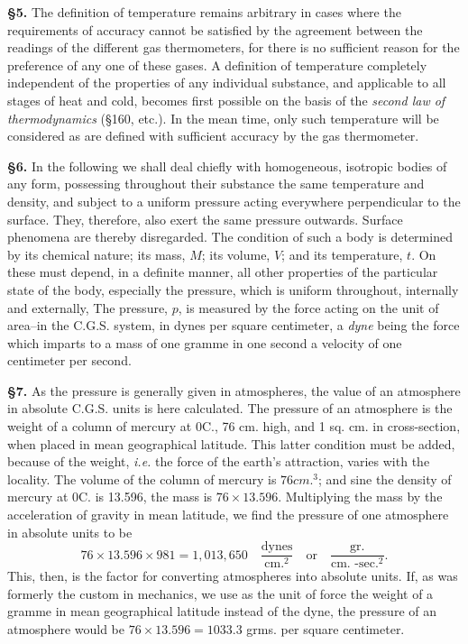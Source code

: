 \documentclass[oneside,12pt]{book}
\begin{document}
\textbf{\S 5.} The definition of temperature remains arbitrary in cases where the requirements of accuracy cannot be satisfied by the agreement between the readings of the different gas thermometers, for there is no sufficient reason for the preference of any one of these gases. A definition of temperature completely independent of the properties of any individual substance, and applicable to all stages of heat and cold, becomes first possible on the basis of the \textit{second law of thermodynamics} (\S 160, etc.). In the mean time, only such temperature will be considered as are defined with sufficient accuracy by the gas thermometer. \par

\textbf{\S 6.} In the following we shall deal chiefly with homogeneous, isotropic bodies of any form, possessing throughout their substance the same temperature and density, and subject to a uniform pressure acting everywhere perpendicular to the surface. They, therefore, also exert the same pressure outwards. Surface phenomena are thereby disregarded. The condition of such a body is determined by its chemical nature; its mass, $M$; its volume, $V$; and its temperature, $t$. On these must depend, in a definite manner, all other properties of the particular state of the body, especially the pressure, which is uniform throughout, internally and externally, The pressure, $p$, is measured by the force acting on the unit of area--in the C.G.S. system, in dynes per square centimeter, a \textit{dyne} being the force which imparts to a mass of one gramme in one second a velocity of one centimeter per second. \par

\textbf{\S 7.} As the pressure is generally given in atmospheres, the value of an atmosphere in absolute C.G.S. units is here calculated. The pressure of an atmosphere is the weight of a column of mercury at 0\textdegree C., 76 cm. high, and 1 sq. cm. in cross-section, when placed in mean geographical latitude. This latter condition must be added, because of the weight, \textit{i.e.} the force of the earth's attraction, varies with the locality. The volume of the column of mercury is $76 cm.^3$; and sine the density of mercury at 0\textdegree C. is 13.596, the mass is $76 \times 13.596$. Multiplying the mass by the acceleration of gravity in mean latitude, we find the pressure of one atmosphere in absolute units to be
$$76 \times 13.596 \times 981 = 1,013,650\quad\frac{\text{dynes}}{\text{cm.}^2}\quad \text{or} \quad \frac{\text{gr.}}{\text{cm. -sec.}^2}.$$
This, then, is the factor for converting atmospheres into absolute units. If, as was formerly the custom in mechanics, we use as the unit of force the weight of a gramme in mean geographical latitude instead of the dyne, the pressure of an atmosphere would be $76 \times 13.596 = 1033.3$ grms. per square centimeter. \par
\end{document}
